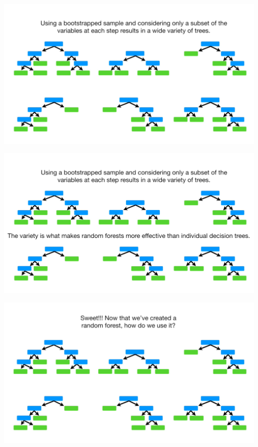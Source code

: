 \documentclass[
  ignorenonframetext,
]{beamer}
\begin{document}
\begin{frame}{}
\protect\hypertarget{section-44}{}
\includegraphics{images/r45.png}
\end{frame}

\begin{frame}{}
\protect\hypertarget{section-45}{}
\includegraphics{images/r46.png}
\end{frame}

\begin{frame}{}
\protect\hypertarget{section-46}{}
\includegraphics{images/r47.png}
\end{frame}
\end{document}
